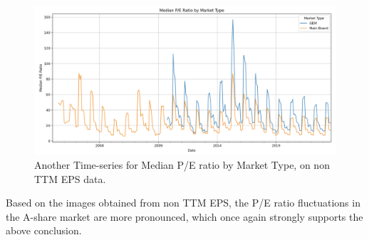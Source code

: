 \begin{figure}[h]
\centering
\includegraphics[width=01\textwidth]{data/median P-E 1.png}
\caption{Another Time-series for Median P/E ratio by Market Type, on non TTM EPS data.}
\label{fig:example}
\end{figure}


Based on the images obtained from non TTM EPS, the P/E ratio fluctuations in the A-share market are more pronounced, which once again strongly supports the above conclusion.